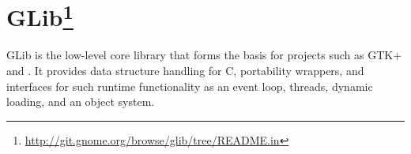 
\section[GLib]{GLib\footnote{\url{http://git.gnome.org/browse/glib/tree/README.in}}}\label{sec:GLib}

GLib is the low-level core library that forms the basis for projects such as GTK+ and \GNOME. It provides data structure handling for C, portability wrappers, and interfaces for such runtime functionality as an event loop, threads, dynamic loading, and an object system.
